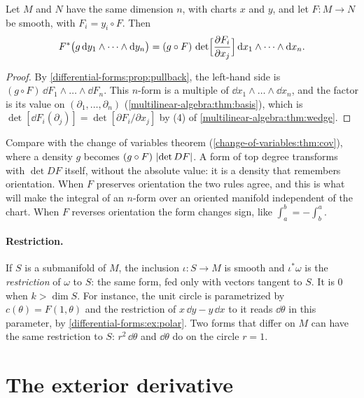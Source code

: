 \begin{notechapter}
\begin{theorem}\label{differential-forms:thm:top}
Let $M$ and $N$ have the same dimension $n$, with charts $x$ and $y$,
and let $F:M\to N$ be smooth, with $F_i = y_i\circ F$. Then
\[
  F^*\bigl(g\,\mathrm{d} y_1\wedge\dots\wedge\mathrm{d} y_n\bigr)
  = (g\circ F)\,\det\Bigl[\frac{\partial F_i}{\partial x_j}\Bigr]\,
    \mathrm{d} x_1\wedge\dots\wedge\mathrm{d} x_n .
\]
\end{theorem}

\begin{proof}
By \cref{differential-forms:prop:pullback}, the left-hand side is
$(g\circ F)\,\dd F_1\wedge\dots\wedge\dd F_n$. This $n$-form is a
multiple of $\dd x_1\wedge\dots\wedge\dd x_n$, and the factor is its
value on $(\partial_1,\dots,\partial_n)$
(\cref{multilinear-algebra:thm:basis}), which is
$\det[\dd F_i(\partial_j)] = \det[\partial F_i/\partial x_j]$ by (4) of
\cref{multilinear-algebra:thm:wedge}.
\end{proof}

\begin{keyidea}
Compare with the change of variables theorem
(\cref{change-of-variables:thm:cov}), where a density $g$ becomes
$(g\circ F)\,\left|\det DF\right|$. A form of top degree transforms with
$\det DF$ itself, without the absolute value: it is a density that
remembers orientation. When $F$ preserves orientation the two rules
agree, and this is what will make the integral of an $n$-form over an
oriented manifold independent of the chart. When $F$ reverses
orientation the form changes sign, like $\int_a^b = -\int_b^a$.
\end{keyidea}

\paragraph{Restriction.} If $S$ is a submanifold of $M$, the inclusion
$\iota:S\to M$ is smooth and $\iota^*\omega$ is the \emph{restriction}
of $\omega$ to $S$: the same form, fed only with vectors tangent to $S$.
It is $0$ when $k > \dim S$. For instance, the unit circle is
parametrized by $c(\theta) = F(1, \theta)$ and the restriction of
$x\,\dd y - y\,\dd x$ to it reads $\dd\theta$ in this parameter, by
\cref{differential-forms:ex:polar}. Two forms that differ on $M$ can
have the same restriction to $S$: $r^2\,\dd\theta$ and $\dd\theta$ do on
the circle $r = 1$.

\section{The exterior derivative}\label{differential-forms:sec:d}


\end{notechapter}
